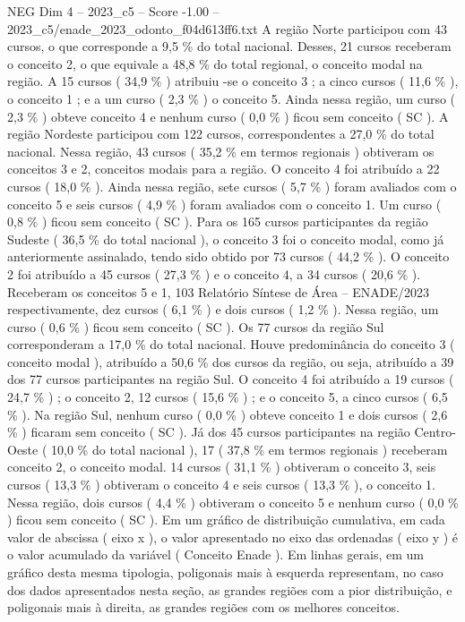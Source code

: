 \begin{textsample}{NEG Dim 4 – 2023\_c5 – Score -1.00 – 2023\_c5/enade\_2023\_odonto\_f04d613ff6.txt}
A região Norte participou com 43 cursos, o que corresponde a 9,5 \% do total nacional.
Desses, 21 cursos receberam o conceito 2, o que equivale a 48,8 \% do total regional, o conceito modal na região.
A 15 cursos ( 34,9 \% ) atribuiu -se o conceito 3 ; a cinco cursos ( 11,6 \% ), o conceito 1 ; e a um curso ( 2,3 \% ) o conceito 5.
Ainda nessa região, um curso ( 2,3 \% ) obteve conceito 4 e nenhum curso ( 0,0 \% ) ficou sem conceito ( SC ).
A região Nordeste participou com 122 cursos, correspondentes a 27,0 \% do total nacional.
Nessa região, 43 cursos ( 35,2 \% em termos regionais ) obtiveram os conceitos 3 e 2, conceitos modais para a região.
O conceito 4 foi atribuído a 22 cursos ( 18,0 \% ).
Ainda nessa região, sete cursos ( 5,7 \% ) foram avaliados com o conceito 5 e seis cursos ( 4,9 \% ) foram avaliados com o conceito 1.
Um curso ( 0,8 \% ) ficou sem conceito ( SC ).
Para os 165 cursos participantes da região Sudeste ( 36,5 \% do total nacional ), o conceito 3 foi o conceito modal, como já anteriormente assinalado, tendo sido obtido por 73 cursos ( 44,2 \% ).
O conceito 2 foi atribuído a 45 cursos ( 27,3 \% ) e o conceito 4, a 34 cursos ( 20,6 \% ).
Receberam os conceitos 5 e 1, 103 Relatório Síntese de Área – ENADE/2023 respectivamente, dez cursos ( 6,1 \% ) e dois cursos ( 1,2 \% ).
Nessa região, um curso ( 0,6 \% ) ficou sem conceito ( SC ).
Os 77 cursos da região Sul corresponderam a 17,0 \% do total nacional.
Houve predominância do conceito 3 ( conceito modal ), atribuído a 50,6 \% dos cursos da região, ou seja, atribuído a 39 dos 77 cursos participantes na região Sul.
O conceito 4 foi atribuído a 19 cursos ( 24,7 \% ) ; o conceito 2, 12 cursos ( 15,6 \% ) ; e o conceito 5, a cinco cursos ( 6,5 \% ).
Na região Sul, nenhum curso ( 0,0 \% ) obteve conceito 1 e dois cursos ( 2,6 \% ) ficaram sem conceito ( SC ).
Já dos 45 cursos participantes na região Centro-Oeste ( 10,0 \% do total nacional ), 17 ( 37,8 \% em termos regionais ) receberam conceito 2, o conceito modal. 14 cursos ( 31,1 \% ) obtiveram o conceito 3, seis cursos ( 13,3 \% ) obtiveram o conceito 4 e seis cursos ( 13,3 \% ), o conceito 1.
Nessa região, dois cursos ( 4,4 \% ) obtiveram o conceito 5 e nenhum curso ( 0,0 \% ) ficou sem conceito ( SC ).
Em um gráfico de distribuição cumulativa, em cada valor de abscissa ( eixo x ), o valor apresentado no eixo das ordenadas ( eixo y ) é o valor acumulado da variável ( Conceito Enade ).
Em linhas gerais, em um gráfico desta mesma tipologia, poligonais mais à esquerda representam, no caso dos dados apresentados nesta seção, as grandes regiões com a pior distribuição, e poligonais mais à direita, as grandes regiões com os melhores conceitos.

\end{textsample}
